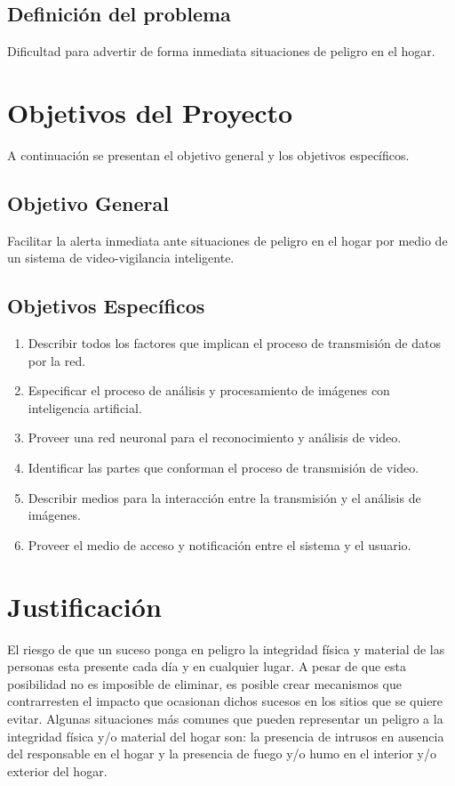 \subsection{Definición del problema}
Dificultad para advertir de forma inmediata situaciones de peligro en el hogar.

\section{Objetivos del Proyecto}
A continuación se presentan el objetivo general y los objetivos específicos.

\subsection{Objetivo General}
Facilitar la alerta inmediata ante situaciones de peligro en el hogar por medio de un sistema de video-vigilancia inteligente.

\subsection{Objetivos Específicos}
\begin{enumerate}
    \item Describir todos los factores que implican el proceso de transmisión de datos por la red.
    \item Especificar el proceso de análisis y procesamiento de imágenes con inteligencia artificial.
    \item Proveer una red neuronal para el reconocimiento y análisis de video.
    \item Identificar las partes que conforman el proceso de transmisión de video.
    \item Describir medios para la interacción entre la transmisión y el análisis de imágenes.
    \item Proveer el medio de acceso y notificación entre el sistema y el usuario.
\end{enumerate}

\section{Justificación}
El riesgo de que un suceso ponga en peligro la integridad física y material de las personas esta presente cada día y en cualquier lugar. A pesar de que esta posibilidad no es imposible de eliminar, es posible crear mecanismos que contrarresten el impacto que ocasionan dichos sucesos en los sitios que se quiere evitar. Algunas situaciones más comunes que pueden representar un peligro a la integridad física y/o material del hogar son: la presencia de intrusos en ausencia del responsable en el hogar y la presencia de fuego y/o humo en el interior y/o exterior del hogar.\\


